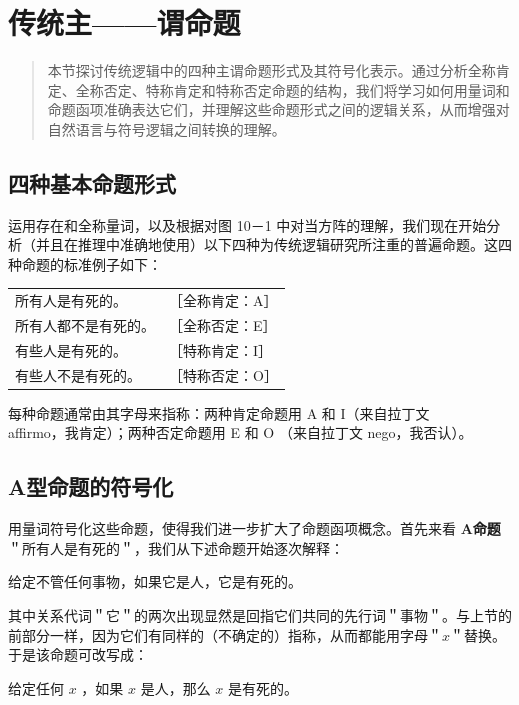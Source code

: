 \section{传统主——谓命题}

\begin{quotation}
本节探讨传统逻辑中的四种主谓命题形式及其符号化表示。通过分析全称肯定、全称否定、特称肯定和特称否定命题的结构，我们将学习如何用量词和命题函项准确表达它们，并理解这些命题形式之间的逻辑关系，从而增强对自然语言与符号逻辑之间转换的理解。
\end{quotation}

\subsection{四种基本命题形式}

运用存在和全称量词，以及根据对图 10－1 中对当方阵的理解，我们现在开始分析（并且在推理中准确地使用）以下四种为传统逻辑研究所注重的普遍命题。这四种命题的标准例子如下：

\begin{center}
\begin{tabular}{ll}
所有人是有死的。 & ［全称肯定：A］ \\
所有人都不是有死的。 & ［全称否定：E］ \\
有些人是有死的。 & ［特称肯定：I］ \\
有些人不是有死的。 & ［特称否定：O］ \\
\end{tabular}
\end{center}

每种命题通常由其字母来指称：两种肯定命题用 A 和 I（来自拉丁文\\
affirmo，我肯定）；两种否定命题用 E 和 O （来自拉丁文 nego，我否认）。\cite{peirce1883}

\subsection{A型命题的符号化}

用量词符号化这些命题，使得我们进一步扩大了命题函项概念。首先来看 \textbf{A命题}＂所有人是有死的＂，我们从下述命题开始逐次解释：

给定不管任何事物，如果它是人，它是有死的。

其中关系代词＂它＂的两次出现显然是回指它们共同的先行词＂事物＂。与上节的前部分一样，因为它们有同样的（不确定的）指称，从而都能用字母＂$x$＂替换。于是该命题可改写成：

给定任何 $x$ ，如果 $x$ 是人，那么 $x$ 是有死的。

